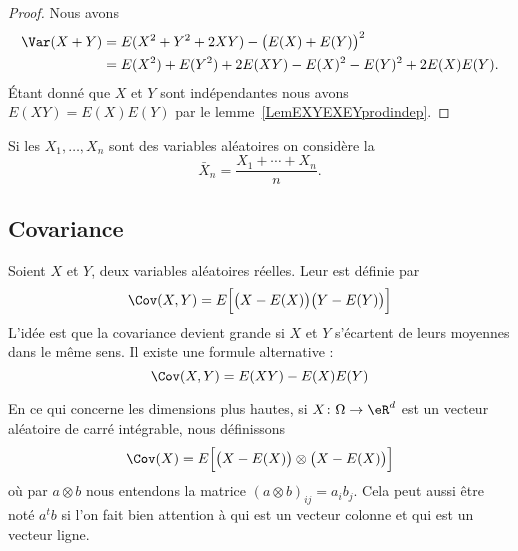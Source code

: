 \begin{proof}
	Nous avons
	\begin{subequations}
		\begin{align}
			\Var(X+Y) & =E(X^2+Y^2+2XY)-\big( E(X)+E(Y) \big)^2        \\
			          & =E(X^2)+E(Y^2)+2E(XY)-E(X)^2-E(Y)^2+2E(X)E(Y).
		\end{align}
	\end{subequations}
	Étant donné que \( X\) et \( Y\) sont indépendantes nous avons \( E(XY)=E(X)E(Y)\) par le lemme~\ref{LemEXYEXEYprodindep}.
\end{proof}

Si les \( X_1,\ldots,X_n\) sont des variables aléatoires on considère la 
\begin{equation}
	\bar X_n=\frac{ X_1+\cdots+X_n }{ n }.
\end{equation}

\subsection{Covariance}

Soient \( X\) et \( Y\), deux variables aléatoires réelles. Leur  est définie par
\begin{equation}    \label{EqHUWtttN}
	\Cov(X,Y)=E\Big[ \big( X-E(X) \big)\big( Y-E(Y) \big) \Big]
\end{equation}
L'idée est que la covariance devient grande si \( X\) et \( Y\) s'écartent de leurs moyennes dans le même sens. Il existe une formule alternative :
\begin{equation}
	\Cov(X,Y)=E(XY)-E(X)E(Y)
\end{equation}

En ce qui concerne les dimensions plus hautes, si \( X\colon \Omega\to \eR^d\) est un vecteur aléatoire de carré intégrable, nous définissons
\begin{equation}    \label{EqZlvLWx}
	\Cov(X)=E\Big[ \big(  X-E(X) \big)\otimes\big( X-E(X)\big) \Big]
\end{equation}
où par \( a\otimes b\) nous entendons la matrice \( (a\otimes b)_{ij}=a_ib_j\). Cela peut aussi être noté \( a^tb\) si l'on fait bien attention à qui est un vecteur colonne et qui est un vecteur ligne.

